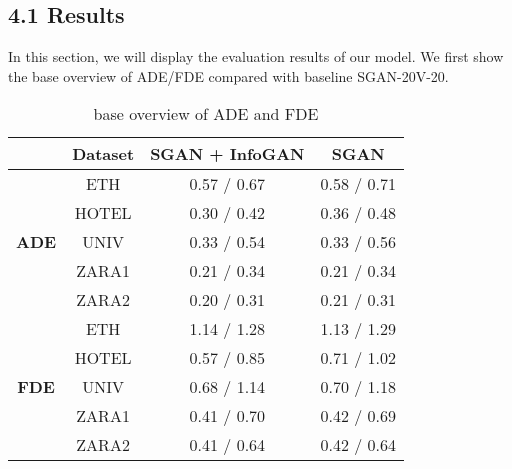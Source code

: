 \subsection{4.1 Results}

In this section, we will display the evaluation results of our model. We first show the base overview of ADE/FDE compared with baseline SGAN-20V-20.

\begin{table}[ht]
  \centering
  \caption{base overview of ADE and FDE} 
  \begin{tabular}{cccc}
  \toprule
  & Dataset & SGAN + InfoGAN &  SGAN \\
  \midrule
  \multirow{5}{*}{\bf ADE} & ETH & 0.57 / 0.67 & 0.58 / 0.71 \\
                         & HOTEL & 0.30 / 0.42 & 0.36 / 0.48 \\
                         & UNIV & 0.33 / 0.54 & 0.33 / 0.56 \\
                         & ZARA1 & 0.21 / 0.34 & 0.21 / 0.34 \\
                         & ZARA2 & 0.20 / 0.31  & 0.21 / 0.31 \\
  \hline
  \multirow{5}{*}{\bf FDE} & ETH & 1.14 / 1.28 & 1.13 / 1.29 \\
                        & HOTEL & 0.57 / 0.85 & 0.71 / 1.02 \\
                        & UNIV & 0.68 / 1.14 & 0.70 / 1.18 \\
                        & ZARA1 & 0.41 / 0.70 & 0.42 / 0.69 \\
                        & ZARA2 & 0.41 / 0.64  & 0.42 / 0.64 \\

  \bottomrule
  \end{tabular}
\end{table}
